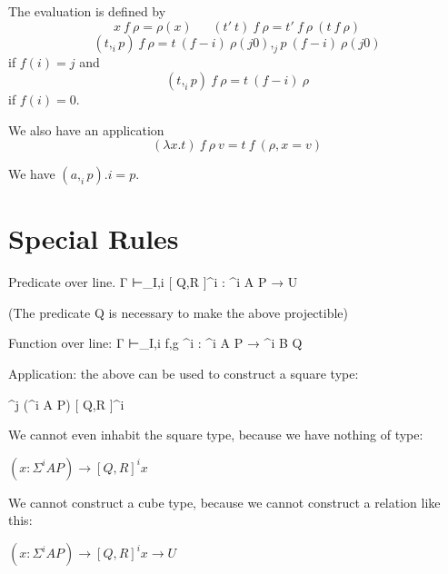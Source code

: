 \documentclass[10pt,a4paper]{article}
\newcommand\CSig[1]{\Sigma^{#1}}
\newcommand\linefun[3]{\langle #2,#3 \rangle^{#1}}
\newcommand\linepred[3]{[ #2,#3 ]^{#1}}
\begin{document}
 The evaluation is defined by
$$
x~f~\rho = \rho(x)~~~~~~~(t'~t)~f~\rho = t'~f~\rho~(t~f~\rho)
$$
$$
(t,_i p)~f~\rho = t~(f-i)~\rho(j0),_j p~(f-i)~\rho(j0)
$$
if $f(i) = j$ and 
$$
(t,_i p)~f~\rho = t~(f-i)~\rho
$$
if $f(i) = 0$.

 We also have an application
$$
(\lambda x.t)~f~\rho~v = t~f~(\rho,x=v)
$$

 We have $(a,_i p).i = p$.





\section{Special Rules}



Predicate over line. 
          {Γ ⊢_{I,i} \linepred i Q R : \CSig i A P → U}

(The predicate Q is necessary to make the above projectible)

Function over line:
          {Γ ⊢_{I,i} \linefun i f g : \CSig i A P → \CSig i B Q }


Application: the above can be used to construct a square type:

          {\CSig j {(\CSig i A P)} \linepred i Q R}

We cannot even inhabit the square type, because we have nothing of type:

$(x : \CSig i A P) → \linepred i Q R x$

We cannot construct a cube type, because we cannot construct a relation like this:

$(x : \CSig i A P) → \linepred i Q R x → U$
\end{document}
